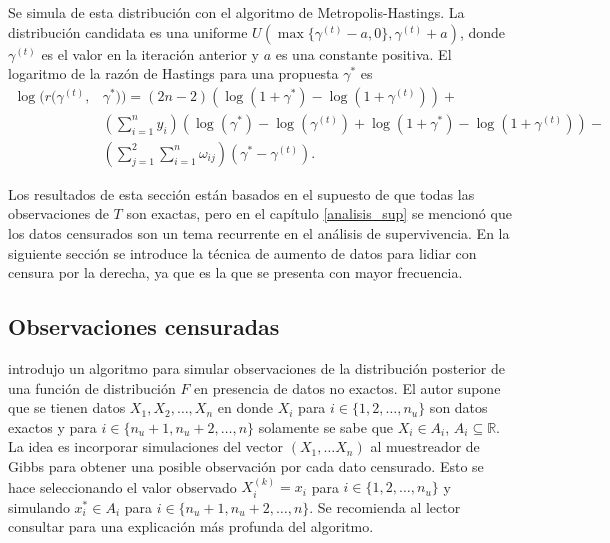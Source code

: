 \documentclass[11pt,a4paper]{article}
\begin{document}
Se simula de esta distribución con el algoritmo de Metropolis-Hastings. La distribución candidata es una uniforme $U\left( \max \lbrace \gamma^{(t)} - a, 0 \rbrace, \gamma^{(t)} + a \right)$, donde $\gamma^{(t)}$ es el valor en la iteración anterior y $a$ es una constante positiva. El logaritmo de la razón de Hastings para una propuesta $\gamma^*$ es 
\begin{align*}
\log (r(\gamma^{(t)}, &\gamma^*)) = (2n - 2)\left(\log (1 + \gamma^*) - \log (1 + \gamma^{(t)})\right) +\\
&\left(\sum_{i=1}^n y_i \right) \left(\log (\gamma^*) - \log (\gamma^{(t)}) + \log (1 + \gamma^*) - \log (1 + \gamma^{(t)})\right) -\\
& \left( \sum_{j = 1}^2 \sum_{i = 1}^n \omega_{ij} \right) (\gamma^* - \gamma^{(t)}).
\end{align*}

Los resultados de esta sección están basados en el supuesto de que todas las observaciones de $T$ son exactas, pero  en el capítulo \ref{analisis_sup} se mencionó que los datos censurados son un tema recurrente en el análisis de supervivencia. En la siguiente sección se introduce la técnica de aumento de datos para lidiar con censura por la derecha, ya que es la que se presenta con mayor frecuencia.

\subsection{Observaciones censuradas}

\citet{doss_sampling} introdujo un algoritmo para simular observaciones de la distribución posterior de una función de distribución $F$ en presencia de datos no exactos. El autor supone que se tienen datos $X_1, X_2, \dots, X_n$ en donde $X_i$ para $i \in \lbrace 1, 2, \dots, n_u \rbrace$ son datos exactos y para $ i \in \lbrace n_u+1, n_u + 2, \dots, n \rbrace$ solamente se sabe que $X_i \in A_i$, $A_i \subseteq \mathbb{R}.$ La idea es incorporar simulaciones del vector $(X_1, \dots X_n)$ al muestreador de Gibbs para obtener una posible observación por cada dato censurado. Esto se hace seleccionando el valor observado $X_i^{(k)} = x_i$ para $i \in \lbrace 1, 2, \dots, n_u \rbrace$ y simulando $x^*_i \in A_i$ para $ i \in \lbrace n_u+1, n_u + 2, \dots, n \rbrace$. Se recomienda al lector consultar \citet{doss_sampling} para una explicación más profunda del algoritmo.
\end{document}
